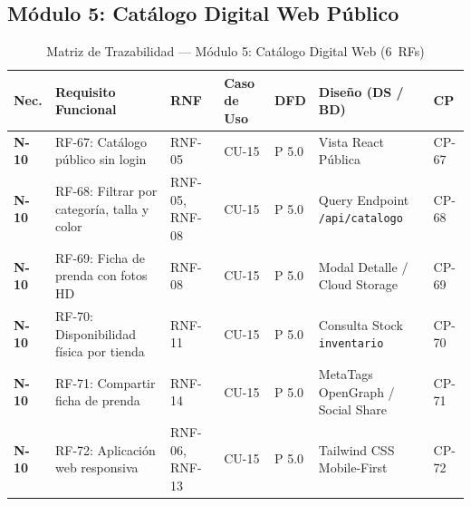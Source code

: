 \subsection{M\'odulo 5: Cat\'alogo Digital Web P\'ublico}
\begin{table}[H]
\centering\scriptsize
\begin{tabularx}{\textwidth}{>{\centering\bfseries}p{1.2cm} Y >{\centering\arraybackslash}p{2.0cm} >{\centering\arraybackslash}p{1.5cm} >{\centering\arraybackslash}p{1.0cm} >{\raggedright\arraybackslash}p{3.0cm} >{\centering\arraybackslash}p{1.2cm}}
\toprule
\textbf{Nec.} & \textbf{Requisito Funcional} & \textbf{RNF} & \textbf{Caso de Uso} & \textbf{DFD} & \textbf{Dise\~no (DS / BD)} & \textbf{CP} \\
\midrule
N-10 & RF-67: Cat\'alogo p\'ublico sin login & RNF-05 & CU-15 & P 5.0 & Vista React P\'ublica & CP-67 \\
N-10 & RF-68: Filtrar por categor\'ia, talla y color & RNF-05, RNF-08 & CU-15 & P 5.0 & Query Endpoint \texttt{/api/catalogo} & CP-68 \\
N-10 & RF-69: Ficha de prenda con fotos HD & RNF-08 & CU-15 & P 5.0 & Modal Detalle / Cloud Storage & CP-69 \\
N-10 & RF-70: Disponibilidad f\'isica por tienda & RNF-11 & CU-15 & P 5.0 & Consulta Stock \texttt{inventario} & CP-70 \\
N-10 & RF-71: Compartir ficha de prenda & RNF-14 & CU-15 & P 5.0 & MetaTags OpenGraph / Social Share & CP-71 \\
N-10 & RF-72: Aplicaci\'on web responsiva & RNF-06, RNF-13 & CU-15 & P 5.0 & Tailwind CSS Mobile-First & CP-72 \\
\bottomrule
\end{tabularx}
\caption{Matriz de Trazabilidad --- M\'odulo 5: Cat\'alogo Digital Web (6~RFs)}
\label{tab:trazabilidad_modulo5}
\end{table}
